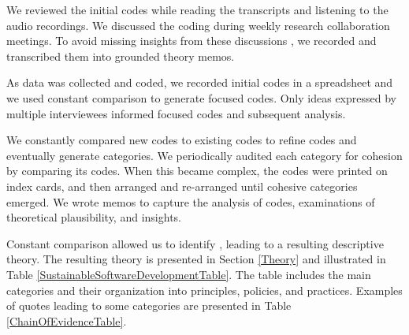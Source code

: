 We reviewed the initial codes while reading the transcripts and listening to the audio recordings. We discussed the coding during weekly research collaboration meetings. To avoid missing insights from these discussions \cite{GlaserTheoreticalSensitivity}, we recorded and transcribed them into grounded theory memos. 

As data was collected and coded, we recorded initial codes in a spreadsheet and we used constant comparison to generate focused codes. Only ideas expressed by multiple interviewees informed focused codes and subsequent analysis.

We constantly compared new codes to existing codes to refine codes and eventually generate categories. We periodically audited each category for cohesion by comparing its codes. When this became complex, the codes were printed on index cards, and then arranged and re-arranged until cohesive categories emerged. We wrote memos to capture the analysis of codes, examinations of theoretical plausibility, and insights. 

Constant comparison allowed us to identify  \cite{GlaserBasics}, leading to a resulting descriptive theory. The resulting theory is presented in Section \ref{Theory} and illustrated in Table \ref{SustainableSoftwareDevelopmentTable}. The table includes the main categories and their organization into principles, policies, and practices. Examples of quotes leading to some categories are presented in Table \ref{ChainOfEvidenceTable}.


